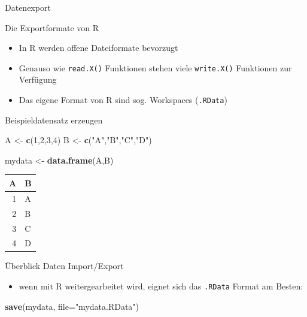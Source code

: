 \documentclass[ignorenonframetext,]{beamer}
\newenvironment{Shaded}{}{}
\newcommand{\KeywordTok}[1]{\textcolor[rgb]{0.00,0.44,0.13}{\textbf{{#1}}}}
\newcommand{\DataTypeTok}[1]{\textcolor[rgb]{0.56,0.13,0.00}{{#1}}}
\newcommand{\DecValTok}[1]{\textcolor[rgb]{0.25,0.63,0.44}{{#1}}}
\newcommand{\StringTok}[1]{\textcolor[rgb]{0.25,0.44,0.63}{{#1}}}
\newcommand{\NormalTok}[1]{{#1}}
\providecommand{\tightlist}{%
\setlength{\itemsep}{0pt}\setlength{\parskip}{0pt}}
\begin{document}
\begin{frame}[fragile]{Datenexport}

\begin{block}{Die Exportformate von R}

\begin{itemize}
\tightlist
\item
  In R werden offene Dateiformate bevorzugt
\item
  Genauso wie \texttt{read.X()} Funktionen stehen viele
  \texttt{write.X()} Funktionen zur Verfügung
\item
  Das eigene Format von R sind sog. Workspaces (\texttt{.RData})
\end{itemize}

\end{block}

\begin{block}{Beispieldatensatz erzeugen}

\begin{Shaded}
\begin{Highlighting}[]
\NormalTok{A <-}\StringTok{ }\KeywordTok{c}\NormalTok{(}\DecValTok{1}\NormalTok{,}\DecValTok{2}\NormalTok{,}\DecValTok{3}\NormalTok{,}\DecValTok{4}\NormalTok{)}
\NormalTok{B <-}\StringTok{ }\KeywordTok{c}\NormalTok{(}\StringTok{"A"}\NormalTok{,}\StringTok{"B"}\NormalTok{,}\StringTok{"C"}\NormalTok{,}\StringTok{"D"}\NormalTok{)}

\NormalTok{mydata <-}\StringTok{ }\KeywordTok{data.frame}\NormalTok{(A,B)}
\end{Highlighting}
\end{Shaded}

\begin{longtable}[]{@{}rl@{}}
\toprule
A & B\tabularnewline
\midrule
\endhead
1 & A\tabularnewline
2 & B\tabularnewline
3 & C\tabularnewline
4 & D\tabularnewline
\bottomrule
\end{longtable}

\end{block}

\begin{block}{Überblick Daten Import/Export}

\begin{itemize}
\tightlist
\item
  wenn mit R weitergearbeitet wird, eignet sich das \texttt{.RData}
  Format am Besten:
\end{itemize}

\begin{Shaded}
\begin{Highlighting}[]
\KeywordTok{save}\NormalTok{(mydata, }\DataTypeTok{file=}\StringTok{"mydata.RData"}\NormalTok{)}
\end{Highlighting}
\end{Shaded}


\end{block}
\end{frame}
\end{document}
